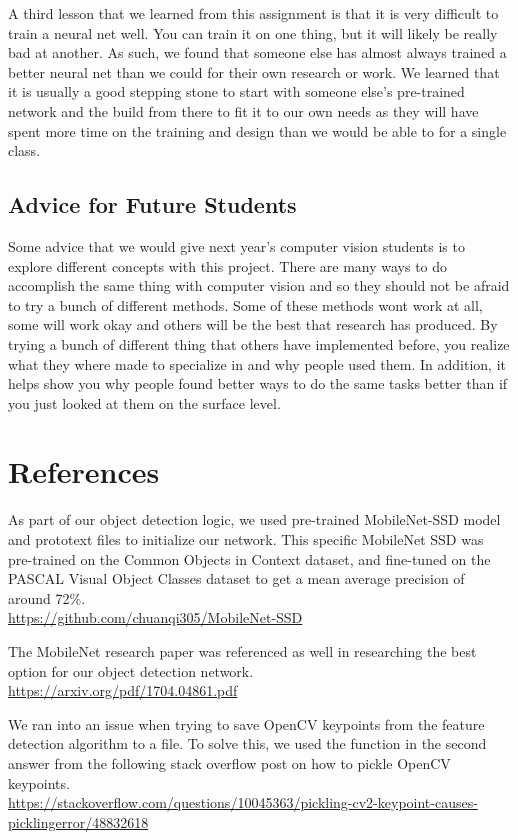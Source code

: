 \documentclass[12pt]{article}
\begin{document}
	A third lesson that we learned from this assignment is that it is very difficult to train a neural net well. You can train it on one thing, but it will likely be really bad at another. As such, we found that someone else has almost always trained a better neural net than we could for their own research or work. We learned that it is usually a good stepping stone to start with someone else's pre-trained network and the build from there to fit it to our own needs as they will have spent more time on the training and design than we would be able to for a single class.

\subsection{Advice for Future Students}
	Some advice that we would give next year's computer vision students is to explore different concepts with this project. There are many ways to do accomplish the same thing with computer vision and so they should not be afraid to try a bunch of different methods. Some of these methods wont work at all, some will work okay and others will be the best that research has produced. By trying a bunch of different thing that others have implemented before, you realize what they where made to specialize in and why people used them. In addition, it helps show you why people found better ways to do the same tasks better than if you just looked at them on the surface level.


\section*{References}
	As part of our object detection logic, we used pre-trained MobileNet-SSD model and prototext files to initialize our network. This specific MobileNet SSD was pre-trained on the Common Objects in Context dataset, and fine-tuned on the PASCAL Visual Object Classes dataset to get a mean average precision of around 72\%. \\
	\url{https://github.com/chuanqi305/MobileNet-SSD}
	
	The MobileNet research paper was referenced as well in researching the best option for our object detection network. \\ \url{https://arxiv.org/pdf/1704.04861.pdf}
	
	We ran into an issue when trying to save OpenCV keypoints from the feature detection algorithm to a file. To solve this, we used the function in the second answer from the following stack overflow post on how to pickle OpenCV keypoints. \\ \url{https://stackoverflow.com/questions/10045363/pickling-cv2-keypoint-causes-picklingerror/48832618}
	
\end{document}
